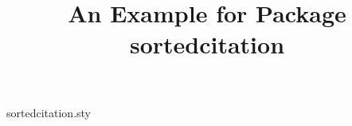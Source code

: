 \begin{filecontents}{sortedcitation.sty}
\newenvironment{sbibliography}{%
\section *{\hypertarget{refpage}{ \refname }}
\parindent=0em}
{%
\ifnum\value{citenum}>0{
\setcounter{tmp}{0}%
	\loop
		\stepcounter{tmp}
		[\csname citeentries\thetmp.seqno\endcsname]\,\csname citeentries\thetmp.ref\endcsname \\
	\ifnum \value{tmp}<\value{citenum} \repeat
	}\fi
\ifnum\value{bibnum}>0{%
\setcounter{tmp}{0}
	\loop
		\stepcounter{tmp}
		[\csname bibentries\thetmp.seqno\endcsname]\,\csname bibentries\thetmp.ref\endcsname \\
	\ifnum \value{tmp}<\value{bibnum} \repeat
	}\fi
}
\end{filecontents}

\documentclass[a4paper]{article}
\usepackage{hyperref}
\usepackage{tikz}
\usetikzlibrary{external}%
\usepackage{fancyvrb-ex}
\usepackage{sortedcitation}
\title{An Example for Package sortedcitation}

\maketitle
This is a note for ``\href{https://pgfplots.sourceforge.net/TeX-programming-notes.pdf}{Notes On Programming in TEX}'', the author Dr. Christian Feuers\~A\textcurrency nger.

\section*{1 Introduction}
This document is intended to provide a direct start with TEX programming (not necessarily TEX typesetting).
The addressed audience consists of people interested in package or library writing.
At the time of this writing, this document is far from complete. Nevertheless, it might be a good starting
point for interested readers. Consult the literature given below for more details.

\section*{2 Programming in TEX}
\subsection*{2.1 Variables in Registers}
TEX provides several different variables and associated registers which can be manipulated freely.


